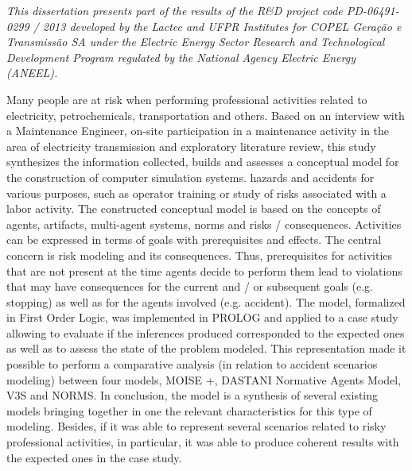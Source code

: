 \textit{This dissertation presents part of the results of the R&D project code PD-06491-0299 / 2013 developed by the Lactec and UFPR Institutes for COPEL Geração e Transmissão SA under the Electric Energy Sector Research and Technological Development Program regulated by the National Agency Electric Energy (ANEEL).}


Many people are at risk when performing professional activities related to electricity, petrochemicals, transportation and others. Based on an interview with a Maintenance Engineer, on-site participation in a maintenance activity in the area of ​​electricity transmission and exploratory literature review, this study synthesizes the information collected, builds and assesses a conceptual model for the construction of computer simulation systems. hazards and accidents for various purposes, such as operator training or study of risks associated with a labor activity. The constructed conceptual model is based on the concepts of agents, artifacts, multi-agent systems, norms and risks / consequences. Activities can be expressed in terms of goals with prerequisites and effects. The central concern is risk modeling and its consequences. Thus, prerequisites for activities that are not present at the time agents decide to perform them lead to violations that may have consequences for the current and / or subsequent goals (e.g. stopping) as well as for the agents involved (e.g. accident). The model, formalized in First Order Logic, was implemented in PROLOG and applied to a case study allowing to evaluate if the inferences produced corresponded to the expected ones as well as to assess the state of the problem modeled. This representation made it possible to perform a comparative analysis (in relation to accident scenarios modeling) between four models, MOISE +, DASTANI Normative Agents Model, V3S and NORMS. In conclusion, the model is a synthesis of several existing models bringing together in one the relevant characteristics for this type of modeling. Besides, if it was able to represent several scenarios related to risky professional activities, in particular, it was able to produce coherent results with the expected ones in the case study.